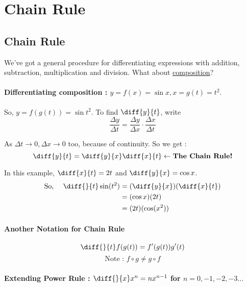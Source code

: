 

\chapter{Chain Rule}  

\bigbreak
\section{Chain Rule}

We've got a general procedure for differentiating expressions with addition, subtraction, multiplication and division.
What about \underline{composition}?

\subsubsection*{Differentiating composition : $y = f(x) = \sin x , x = g(t) = t^2.$}

So, $y = f(g(t)) = \sin t^2$. To find $\diff{y}{t}$, write
$$ \frac{\Delta y}{\Delta t} = \frac{\Delta y}{\Delta x} \cdot \frac{\Delta x}{\Delta t} $$

As $\Delta t \to 0, \Delta x \to 0$ too, because of continuity. So we get : 
$$ \diff{y}{t} = \diff{y}{x} \diff{x}{t} \leftarrow \textbf{The Chain Rule!} $$

In this example, $\diff{x}{t} = 2t$ and $\diff{y}{x} = \cos x$.
\begin{equation*}
\begin{split}
	\text{So, $\quad$} \diff{}{t} \sin(t^2) 
		& = (\diff{y}{x})(\diff{x}{t}) \\
		& = (\cos x)(2t) \\
		& = (2t)(\cos(x^2)) \\
\end{split}
\end{equation*}

\subsubsection*{Another Notation for Chain Rule}

$$ \diff{}{t}f(g(t)) = f'(g(t))g'(t) $$
$$ \text{Note : } f \circ g \neq g \circ f $$

\subsubsection*{Extending Power Rule : $\diff{}{x} x^n = nx^{n-1}$ for $n = 0, -1, -2, -3\ldots$}

